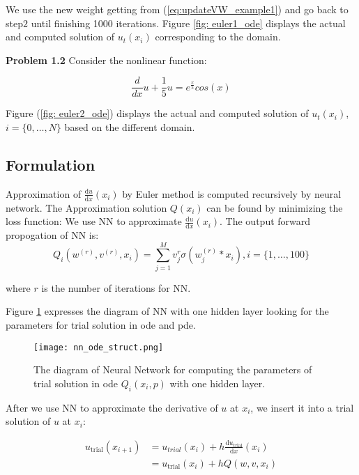 \documentclass{article}
\begin{document}
		\medspace \noindent
	We use the new weight getting from (\ref{eq:updateVW_example1}) and go back to step$2$ until finishing 1000 iterations. 
	Figure \ref{fig: euler1_ode} displays the actual and computed solution of $u _t(x_i)$ corresponding to the domain.

	\medspace \noindent
	\textbf{Problem 1.2} Consider the nonlinear function:
	
	\[\frac{d}{dx} u + \frac{1}{5} u = e^{\frac{x}{5}}cos(x)\]

	\medspace \noindent
	Figure (\ref{fig: euler2_ode}) displays the actual and computed solution of $u _t(x_i)$, $i=\{0, \dots, N\}$ based on the different domain.
	
	\subsection{Formulation}

	Approximation of $\frac{\mathrm{d}u}{\mathrm{d}x}(x_i)$ by Euler method is computed recursively by neural network. 
	The Approximation solution $Q(x_i)$ can be found by minimizing the loss function:
	We use NN to approximate $\frac{\mathrm{d}u}{\mathrm{d}x}(x_i)$. The output forward propogation of NN is:
	\begin{equation}
	Q_i (w^{(r)},v^{(r)},x_i)=  \sum_{j=1}^{M}  v_{j}^{r}\sigma (w_{j}^{(r)}*x_i), i = \{1, \dots, 100\}
	\end{equation}
	
	\medspace \noindent
	where $r$ is the number of iterations for NN. 
	
	\medspace \noindent
	Figure \ref{fig:nn_ode_struct} expresses the diagram of NN with one hidden layer looking for the parameters for trial solution in ode and pde. 
		\begin{figure}[h]
		\centering
		\texttt{[image: nn\_ode\_struct.png]}
		\caption{The diagram of Neural Network for computing the parameters of trial solution in ode $Q_{i}(x_i,p)$ with one hidden layer. }
		\label{fig:nn_ode_struct}
	\end{figure}
	\medspace \noindent
	After we use NN to approximate the derivative of $u$ at $x_i$, we insert it into a trial solution of $u$ at $x_i$:  
	
	\begin{equation}
	\begin{aligned}
	u_{\text{trial}}(x_{i+1}) &= u_{trial}(x_{i}) +h\frac{\mathrm{d}u_{\text{trial}}}{\mathrm{d}x}(x_i) \\
	&=  u_{\text{trial}}(x_{i}) +hQ(w,v,x_i)
	\end{aligned}
	\end{equation}
	
\end{document}
